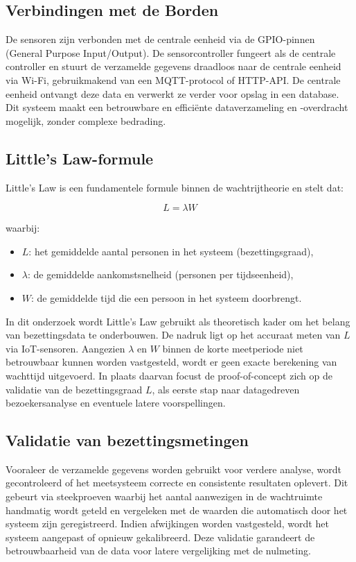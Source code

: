 \subsection{Verbindingen met de Borden}
De sensoren zijn verbonden met de centrale eenheid via de GPIO-pinnen (General Purpose Input/Output). De sensorcontroller fungeert als de centrale controller en stuurt de verzamelde gegevens draadloos naar de centrale eenheid via Wi-Fi, gebruikmakend van een MQTT-protocol of HTTP-API. De centrale eenheid ontvangt deze data en verwerkt ze verder voor opslag in een database. Dit systeem maakt een betrouwbare en efficiënte dataverzameling en -overdracht mogelijk, zonder complexe bedrading.

\subsection{Little's Law-formule}

Little’s Law is een fundamentele formule binnen de wachtrijtheorie en stelt dat:

\[
L = \lambda W
\]

waarbij:
\begin{itemize}
    \item \( L \): het gemiddelde aantal personen in het systeem (bezettingsgraad),
    \item \( \lambda \): de gemiddelde aankomstsnelheid (personen per tijdseenheid),
    \item \( W \): de gemiddelde tijd die een persoon in het systeem doorbrengt.
\end{itemize}

In dit onderzoek wordt Little’s Law gebruikt als theoretisch kader om het belang van bezettingsdata te onderbouwen. De nadruk ligt op het accuraat meten van \( L \) via IoT-sensoren. Aangezien \( \lambda \) en \( W \) binnen de korte meetperiode niet betrouwbaar kunnen worden vastgesteld, wordt er geen exacte berekening van wachttijd uitgevoerd. In plaats daarvan focust de proof-of-concept zich op de validatie van de bezettingsgraad \( L \), als eerste stap naar datagedreven bezoekersanalyse en eventuele latere voorspellingen.


\subsection{Validatie van bezettingsmetingen}
Vooraleer de verzamelde gegevens worden gebruikt voor verdere analyse, wordt gecontroleerd of het meetsysteem correcte en consistente resultaten oplevert. Dit gebeurt via steekproeven waarbij het aantal aanwezigen in de wachtruimte handmatig wordt geteld en vergeleken met de waarden die automatisch door het systeem zijn geregistreerd. Indien afwijkingen worden vastgesteld, wordt het systeem aangepast of opnieuw gekalibreerd. Deze validatie garandeert de betrouwbaarheid van de data voor latere vergelijking met de nulmeting.

